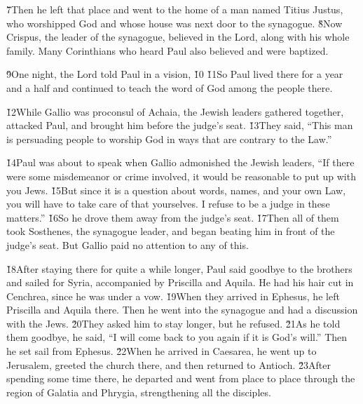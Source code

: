 \v{7}Then he left that place and went to the home of a man named Titius Justus, who worshipped God and whose house was next door to the synagogue. \v{8}Now Crispus, the leader of the synagogue, believed in the Lord, along with his whole family. Many Corinthians who heard Paul also believed and were baptized.

\v{9}One night, the Lord told Paul in a vision,  \v{10} \v{11}So Paul lived there for a year and a half and continued to teach the word of God among the people there.

\v{12}While Gallio was proconsul of Achaia, the Jewish leaders gathered together, attacked Paul, and brought him before the judge's seat. \v{13}They said, ``This man is persuading people to worship God in ways that are contrary to the Law.''

\v{14}Paul was about to speak when Gallio admonished the Jewish leaders, ``If there were some misdemeanor or crime involved, it would be reasonable to put up with you Jews. \v{15}But since it is a question about words, names, and your own Law, you will have to take care of that yourselves. I refuse to be a judge in these matters.'' \v{16}So he drove them away from the judge's seat. \v{17}Then all of them took Sosthenes, the synagogue leader, and began beating him in front of the judge's seat. But Gallio paid no attention to any of this.

\v{18}After staying there for quite a while longer, Paul said goodbye to the brothers and sailed for Syria, accompanied by Priscilla and Aquila. He had his hair cut in Cenchrea, since he was under a vow. \v{19}When they arrived in Ephesus, he left Priscilla and Aquila there. Then he went into the synagogue and had a discussion with the Jews. \v{20}They asked him to stay longer, but he refused. \v{21}As he told them goodbye, he said, ``I will come back to you again if it is God's will.'' Then he set sail from Ephesus. \v{22}When he arrived in Caesarea, he went up to Jerusalem, greeted the church there, and then returned to Antioch. \v{23}After spending some time there, he departed and went from place to place through the region of Galatia and Phrygia, strengthening all the disciples.

